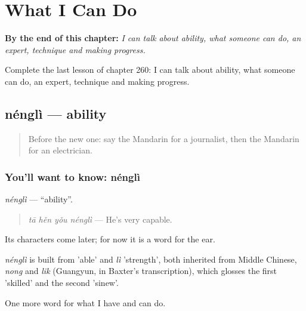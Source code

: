 
\chapter{What I Can Do}
\label{ch:zh-what-i-can-do}

\begin{chapteropening}
\textbf{By the end of this chapter:} \emph{I can talk about ability, what someone can do, an expert, technique and making progress.}

Complete the last lesson of chapter 260: I can talk about ability, what someone can do, an expert, technique and making progress.
\end{chapteropening}

\section[nénglì]{nénglì — ability}

\label{lesson:ZH-C260-nengli}



\begin{quote}
Before the new one: say the Mandarin for a journalist, then the Mandarin for an electrician.
\end{quote}

\subsection*{You'll want to know: nénglì}
\emph{nénglì} — \textquotedblleft{}ability\textquotedblright{}.

\begin{quote}
\emph{tā hěn yǒu nénglì} — He's very capable.
\end{quote}

Its characters come later; for now it is a word for the ear.

\begin{cousinweb}
\emph{nénglì} is built from  'able' and \emph{lì} 'strength', both inherited from Middle Chinese, \emph{nong} and \emph{lik} (Guangyun, in Baxter's transcription), which glosses the first 'skilled' and the second 'sinew'.
\end{cousinweb}

\begin{grammarlens}[title={What you've built}]
One more word for what I have and can do.
\end{grammarlens}

